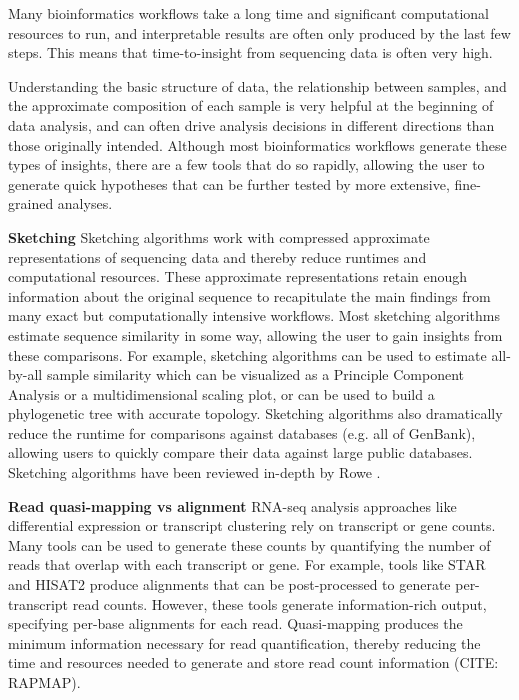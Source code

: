 \documentclass[10pt,letterpaper]{article}
\begin{document}
 Many bioinformatics workflows take a long time and significant computational resources to run, and interpretable results are often only produced by the last few steps. 
This means that time-to-insight from sequencing data is often very high. 
 
Understanding the basic structure of data, the relationship between samples, and the approximate composition of each sample is very helpful at the beginning of data analysis, and can often drive analysis decisions in different directions than those originally intended. 
Although most bioinformatics workflows generate these types of insights, there are a few tools that do so rapidly, allowing the user to generate quick hypotheses that can be further tested by more extensive, fine-grained analyses. 

\textbf{Sketching} Sketching algorithms work with compressed approximate representations of sequencing data and thereby reduce runtimes and computational resources. 
These approximate representations retain enough information about the original sequence to recapitulate the main findings from many exact but computationally intensive workflows. 
Most sketching algorithms estimate sequence similarity in some way, allowing the user to gain insights from these comparisons.
For example, sketching algorithms can be used to estimate all-by-all sample similarity which can be visualized as a Principle Component Analysis or a multidimensional scaling plot, or can be used to build a phylogenetic tree with accurate topology. 
Sketching algorithms also dramatically reduce the runtime for comparisons against databases (e.g. all of GenBank), allowing users to quickly compare their data against large public databases. 
Sketching algorithms have been reviewed in-depth by Rowe \cite{rowe2019streaming}.

\textbf{Read quasi-mapping vs alignment} RNA-seq analysis approaches like differential expression or transcript clustering rely on transcript or gene counts.
Many tools can be used to generate these counts by quantifying the number of reads that overlap with each transcript or gene.
For example, tools like STAR and HISAT2 produce alignments that can be post-processed to generate per-transcript read counts.
However, these tools generate information-rich output, specifying per-base alignments for each read.
Quasi-mapping produces the minimum information necessary for read quantification, thereby reducing the time and resources needed to generate and store read count information (CITE: RAPMAP). 
\end{document}
